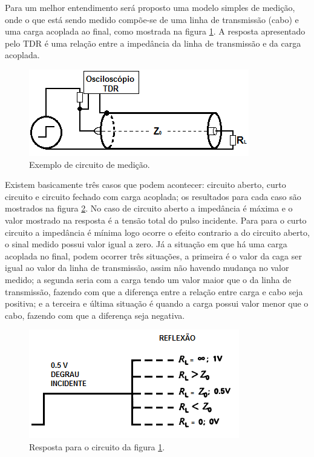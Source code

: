 Para um melhor entendimento será proposto uma modelo simples de medição, onde o que está sendo medido compõe-se de uma linha de transmissão (cabo) e uma carga acoplada ao final, como mostrada na figura \ref{fig:circuito_simples}. A resposta apresentado pelo TDR é uma relação entre a impedância da linha de transmissão e da carga acoplada.

\begin{figure}[htb!]
	\begin{center}
		\includegraphics[scale=.7]{./cap2/figuras/simple_circuit_TDR.png}
		\caption{Exemplo de circuito de medição.}
		\label{fig:circuito_simples}
	\end{center}	
\end{figure}

Existem basicamente três casos que podem acontecer: circuito aberto, curto circuito e circuito fechado com carga acoplada; os resultados para cada caso são mostrados na figura \ref{fig:resp_imp}. No caso de circuito aberto a impedância é máxima e o valor mostrado na resposta é a tensão total do pulso incidente. Para para o curto circuito a impedância é mínima logo ocorre o efeito contrario a do circuito aberto, o sinal medido possui valor igual a zero. Já a situação em que há uma carga acoplada no final, podem ocorrer três situações, a primeira é o valor da caga ser igual ao valor da linha de transmissão, assim não havendo mudança no valor medido; a segunda seria com a carga tendo um valor maior que o da linha de transmissão, fazendo com que a diferença entre a relação entre carga e cabo seja positiva; e a terceira e última situação é quando a carga possui valor menor que o cabo, fazendo com que a diferença seja negativa.



\begin{figure}[htb!]
	\begin{center}
		\includegraphics[scale=.7]{./cap2/figuras/resp_impe.png}
		\caption{Resposta para o circuito da figura \ref{fig:circuito_simples}.}
		\label{fig:resp_imp}
	\end{center}	
\end{figure}



